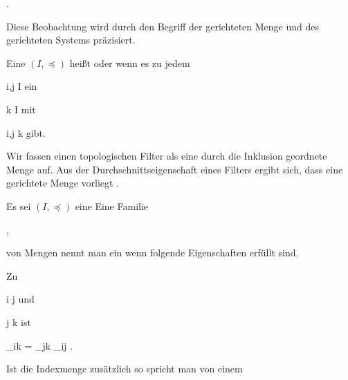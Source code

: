  { . }

Diese Beobachtung wird durch den Begriff der gerichteten Menge und des gerichteten Systems präzisiert.


{}
{





Eine
$(I, \preccurlyeq)$ heißt  oder  wenn es zu jedem

\mavergleichskette
{\vergleichskette
{ i,j
}
{ \in }{ I
}
{  }{
}
{    }{
}
{   }{
}
}
{}{}{}
ein

\mavergleichskette
{\vergleichskette
{ k
}
{ \in }{ I
}
{  }{
}
{    }{
}
{   }{
}
}
{}{}{}
mit

\mavergleichskette
{\vergleichskette
{  i,j
}
{ \preccurlyeq }{ k
}
{  }{
}
{    }{
}
{   }{
}
}
{}{}{}
gibt.





}

Wir fassen einen topologischen Filter als eine durch die Inklusion geordnete Menge auf. Aus der Durchschnittseigenschaft eines Filters ergibt sich, dass eine gerichtete Menge vorliegt
 {} {.}


{}
{





Es sei $(I,  \preccurlyeq)$ eine
Eine Familie

 { , }

von Mengen nennt man ein  wenn folgende Eigenschaften erfüllt sind.
 {Zu

\mavergleichskette
{\vergleichskette
{ i
}
{ \preccurlyeq }{ j
}
{  }{
}
{    }{
}
{   }{
}
}
{}{}{}
und

\mavergleichskette
{\vergleichskette
{ j
}
{ \preccurlyeq }{ k
}
{  }{
}
{    }{
}
{   }{
}
}
{}{}{}
ist

\mavergleichskette
{\vergleichskette
{ \varphi_{ik}
}
{ = }{ \varphi_{jk} \circ  \varphi_{ij}
}
{  }{
}
{    }{
}
{   }{
}
}
{}{}{.}
}
Ist die Indexmenge zusätzlich
so spricht man von einem 





}

